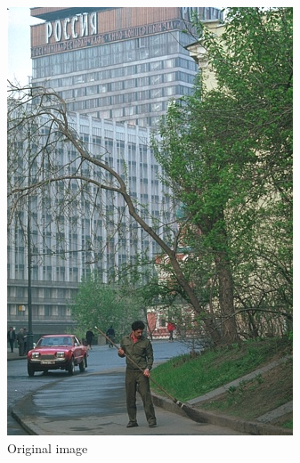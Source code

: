 \documentclass{article}
\begin{document}
\begin{figure}[ht]
\centering
\begin{subfigure}{2.9cm}
  \centering
  \includegraphics[width=0.9\linewidth]{figures/274007}
  \caption{Original image}
  \label{fig:sub1}
\end{subfigure}%
\begin{subfigure}{2.9cm}
  \centering

\end{subfigure}
\end{figure}
\end{document}
